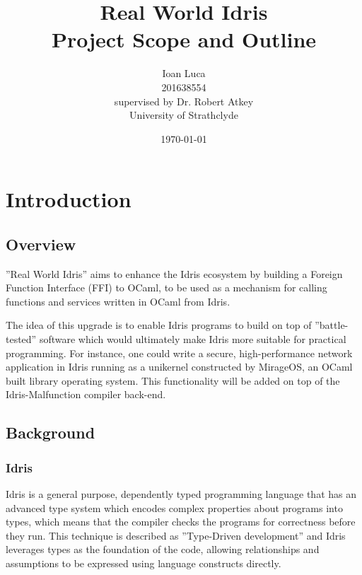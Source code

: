 \documentclass[a4paper]{report}
\begin{document}
\title{Real World Idris \\ Project Scope and Outline}
\author{Ioan Luca \\ 201638554 \\ \small supervised by Dr. Robert Atkey \\
	\small University of Strathclyde} %
\date{\today}
\maketitle


\tableofcontents




\chapter{Introduction}

\section{Overview}

''Real World Idris'' aims to enhance the Idris ecosystem by building a Foreign
Function Interface (FFI) to OCaml, to be used as a mechanism for calling
functions and services written in OCaml from Idris.

The idea of this upgrade is to enable Idris programs to build on top of
''battle-tested'' software which would ultimately make Idris more suitable
for practical programming.
For instance, one could write a secure, high-performance network application in Idris running as a unikernel constructed by MirageOS, an OCaml built library
operating system.
This functionality will be added on top of the Idris-Malfunction compiler
back-end.

\section{Background}

\subsection{Idris}
Idris is a general purpose, dependently typed programming language that has an
advanced type system which encodes complex properties about programs into
types, which means that the compiler checks the programs for correctness
before they run.
This technique is described as ''Type-Driven development'' and Idris leverages
types as the foundation of the code, allowing relationships and assumptions to
be expressed using language constructs directly.
\end{document}
